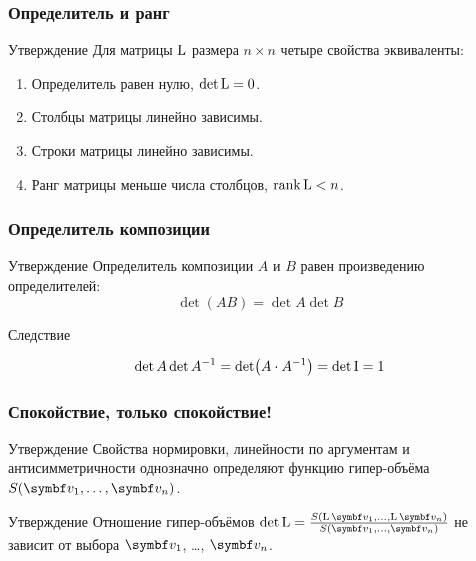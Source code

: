 \begin{frame}
    \frametitle{Определитель и ранг}

    \begin{block}{Утверждение}
        Для матрицы $\operatorname{L}$ размера $n\times n$ четыре свойства эквиваленты:

        \begin{enumerate}
            \item Определитель равен нулю, $\det \operatorname{L} = 0$.
            \pause
            \item Столбцы матрицы линейно зависимы.
            \pause
            \item Строки матрицы линейно зависимы.
            \pause
            \item Ранг матрицы меньше числа столбцов, $\rank \operatorname{L} < n$.
        \end{enumerate}
    \end{block}


    

\end{frame}

\begin{frame}
    \frametitle{Определитель композиции}
    \begin{block}{Утверждение}
        Определитель композиции $A$ и $B$ равен произведению определителей:
        \[
          \det (AB) = \det A \det B  
        \]
    \end{block}
    \pause
    \begin{block}{Следствие}

        \[
        \det A \det A^{-1} = \det (A \cdot A^{-1}) = \det \mathrm{I} = 1
        \]
    \end{block}

\end{frame}





\begin{frame}
    \frametitle{Спокойствие, только спокойствие!}

    \begin{block}{Утверждение}
        Свойства нормировки, линейности по аргументам и антисимметричности однозначно определяют функцию гипер-объёма $S(\bv_1, \ldots, \bv_n)$.
    \end{block}

    \pause

\begin{block}{Утверждение}
    Отношение гипер-объёмов $\det \LL = \frac{S(\LL\bv_1, \ldots, \LL\bv_n)}{S(\bv_1, \ldots, \bv_n)}$ не зависит от выбора $\bv_1$, \ldots, $\bv_n$.
\end{block}


\end{frame}




